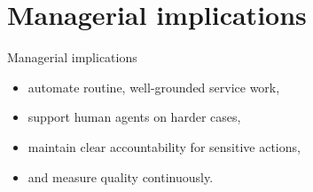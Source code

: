 \documentclass[aspectratio=169]{beamer}
\begin{document}
\section{Managerial implications}

\begin{frame}{Managerial implications}
  \begin{itemize}
    \item automate routine, well-grounded service work,
    \item support human agents on harder cases,
    \item maintain clear accountability for sensitive actions,
    \item and measure quality continuously.
  \end{itemize}
\end{frame}
\end{document}
